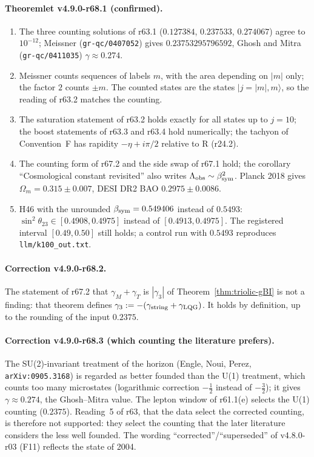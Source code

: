 \paragraph{Theoremlet v4.9.0-r68.1 (confirmed).}
\begin{enumerate}[leftmargin=2em]
\item[(a)] The three counting solutions of r63.1 (\(0.127384\), \(0.237533\), \(0.274067\)) agree to \(10^{-12}\); Meissner (\texttt{gr-qc/0407052}) gives
\(0.23753295796592\), Ghosh and Mitra (\texttt{gr-qc/0411035}) \(\gamma\approx0.274\).
\item[(b)] Meissner counts sequences of labels \(m\), with the area depending on \(|m|\) only; the factor \(2\) counts \(\pm m\).  The counted states are the
states \(|j=|m|,m\rangle\), so the reading of r63.2 matches the counting.
\item[(c)] The saturation statement of r63.2 holds exactly for all states up to \(j=10\); the boost statements of r63.3 and r63.4 hold numerically; the
tachyon of Convention~F has rapidity \(-\eta+i\pi/2\) relative to R (r24.2).
\item[(d)] The counting form of r67.2 and the side swap of r67.1 hold; the corollary ``Cosmological constant revisited'' also writes
\(\Lambda_{\mathrm{obs}}\sim\beta_{\mathrm{sym}}^2\).  Planck 2018 gives \(\Omega_m=0.315\pm0.007\), DESI DR2 BAO \(0.2975\pm0.0086\).
\item[(e)] H46 with the unrounded \(\beta_{\mathrm{sym}}=0.549406\) instead of \(0.5493\): \(\sin^2\theta_{23}\in[0.4908,0.4975]\) instead of \([0.4913,0.4975]\).  The registered
interval \([0.49,0.50]\) still holds; a control run with \(0.5493\) reproduces \texttt{llm/k100\_out.txt}.
\end{enumerate}

\paragraph{Correction v4.9.0-r68.2.}
The statement of r67.2 that \(\gamma_M+\gamma_T\) is \(|\gamma_3|\) of Theorem~\ref{thm:triolic-gBI} is not a finding: that theorem defines
\(\gamma_3:=-(\gamma_{\mathrm{string}}+\gamma_{\mathrm{LQG}})\).  It holds by definition, up to the rounding of the input \(0.2375\).

\paragraph{Correction v4.9.0-r68.3 (which counting the literature prefers).}
The SU(2)-invariant treatment of the horizon (Engle, Noui, Perez, \texttt{arXiv:0905.3168}) is regarded as better founded than the U(1) treatment, which counts
too many microstates (logarithmic correction \(-\tfrac12\) instead of \(-\tfrac32\)); it gives \(\gamma\approx0.274\), the Ghosh--Mitra value.  The lepton window of
r61.1(e) selects the U(1) counting (\(0.2375\)).  Reading~5 of r63, that the data select the corrected counting, is therefore not supported: they select the counting
that the later literature considers the less well founded.  The wording ``corrected''/``superseded'' of v4.8.0-r03 (F11) reflects the state of 2004.

